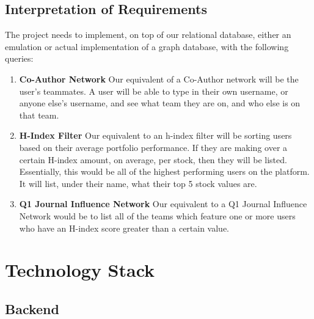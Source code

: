 \documentclass[11pt]{article}
\begin{document}
    \subsection{Interpretation of Requirements}
        The project needs to implement, on top of our relational database, either an emulation or actual
        implementation of a graph database, with the following queries:
        \begin{enumerate}
            \item \textbf{Co-Author Network} Our equivalent of a Co-Author network will be the user's teammates.
            A user will be able to type in their own username, or anyone else's username, and see what team
            they are on, and who else is on that team.
            \item \textbf{H-Index Filter} Our equivalent to an h-index filter will be sorting users based on
            their average portfolio performance. If they are making over a certain H-index amount, on average, per
            stock, then they will be listed. Essentially, this would be all of the highest performing users on the
            platform. It will list, under their name, what their top 5 stock values are.
            \item \textbf{Q1 Journal Influence Network} Our equivalent to a Q1 Journal Influence Network would be to
            list all of the teams which feature one or more users who have an H-index score greater than a 
            certain value.
        \end{enumerate}

\section{Technology Stack}
    \subsection{Backend}
\end{document}
